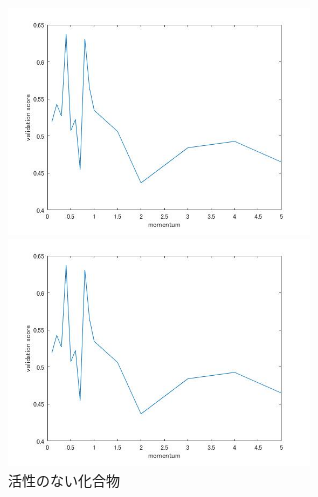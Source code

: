 \documentclass[a4j,11pt]{jarticle}
\begin{document}
\begin{figure}[H]
	\begin{minipage}{0.33\hsize}
		\begin{center}
			\includegraphics[width=8cm, bb=0 0 560 420]{../matlab/test.jpg}
		\end{center}
	\end{minipage}
	\begin{minipage}{0.33\hsize}
		\begin{center}
		\end{center}
	\end{minipage}
	\begin{minipage}{0.33\hsize}
		\begin{center}
			\includegraphics[width=8cm, bb=0 0 560 420]{../matlab/test.jpg}
		\end{center}
	\end{minipage}
	\caption{活性のない化合物} \label{inactive}
\end{figure}
\end{document}
